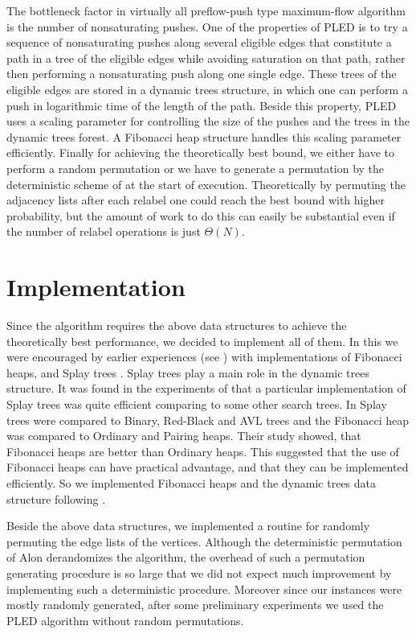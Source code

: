 The bottleneck factor in virtually all preflow-push type
maximum-flow algorithm is the number of nonsaturating pushes. 
One of the properties of PLED is to try a sequence of nonsaturating
pushes along several eligible edges that constitute a path in a tree
of the 
eligible edges while avoiding saturation on that path, rather then
performing a nonsaturating push along one single edge. These trees of
the eligible edges 
are stored in a dynamic trees structure, in which one can perform a
push in logarithmic time of the length of the path. Beside this
property, PLED uses a scaling parameter for controlling the size of the
pushes and the trees in the dynamic trees forest. A Fibonacci heap
structure handles this scaling parameter efficiently. 
Finally for achieving the theoretically best bound, we either have to
perform a random permutation or we have to generate a permutation by
the deterministic scheme of \cite{NA} at the start of execution.
Theoretically by permuting the adjacency lists after each
relabel one could reach the best bound with higher probability, but
the amount of work to do this can easily be substantial even if the
number of relabel operations is just $\Theta(N)$. 

\section{Implementation}

Since the algorithm requires the above data structures to achieve the
theoretically best performance, we decided to implement all of them.
In this we were encouraged by earlier experiences (see \cite{NG}) with
implementations of Fibonacci heaps, and Splay trees \cite{Tj}. Splay
trees play a main role in the dynamic trees structure. It was found in the
experiments of \cite{NG} that a particular implementation of Splay 
trees was quite efficient comparing to some other search trees. 
In \cite{NG} Splay trees were compared to Binary, Red-Black and AVL
trees and the Fibonacci heap was compared to Ordinary and Pairing heaps. 
Their study showed, that Fibonacci heaps are better than Ordinary
heaps. This suggested
that the use of Fibonacci heaps can have practical advantage, and that
they can be implemented efficiently. 
So we implemented Fibonacci heaps and the dynamic trees data
structure following \cite{ST}.

Beside the above data structures, we implemented a routine for randomly
permuting the edge lists of the vertices. Although the deterministic
permutation of Alon derandomizes the algorithm, the overhead of such a
permutation generating procedure is so large that we did not expect
much improvement by implementing such a deterministic procedure.
Moreover since our instances were mostly randomly generated, after some
preliminary experiments we used the PLED algorithm without random
permutations. 


